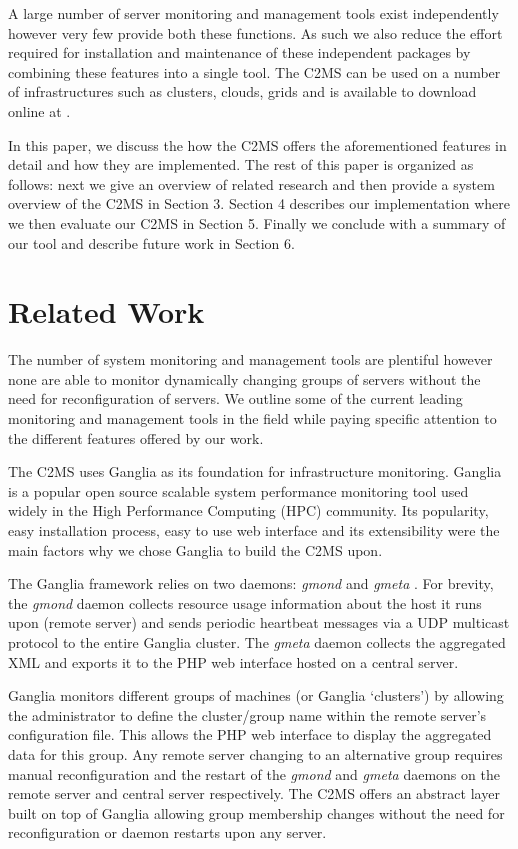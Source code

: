 \documentclass[10pt, conference, compsocconf]{IEEEtran}
\begin{document}
\noindent A large number of server monitoring and management tools exist independently however very few provide both these functions. As such we also reduce the effort required for installation and maintenance of these independent packages by combining these features into a single tool. The C2MS can be used on a number of infrastructures such as clusters, clouds, grids and is available to download online at \cite{c2ms_gary}.

In this paper, we discuss the how the C2MS offers the aforementioned features in detail and how they are implemented. The rest of this paper is organized as follows: next we give an overview of related research and then provide a system overview of the C2MS in Section 3. Section 4 describes our implementation where we then evaluate our C2MS in Section 5. Finally we conclude with a summary of our tool and describe future work in Section 6.

\section{Related Work}
The number of system monitoring and management tools are plentiful however none are able to monitor dynamically changing groups of servers without the need for reconfiguration of servers. We outline some of the current leading monitoring and management tools in the field while paying specific attention to the different features offered by our work. 

The C2MS uses Ganglia as its foundation for infrastructure monitoring. Ganglia is a popular open source scalable system performance monitoring tool \cite{ganglia,wide_area_ganglia,monitoring_taxonomy} used widely in the High Performance Computing (HPC) community. Its popularity, easy installation process, easy to use web interface and its extensibility were the main factors why we chose Ganglia to build the C2MS upon.

The Ganglia framework relies on two daemons: \textit{gmond} and \textit{gmeta} \cite{Massie2012}. For brevity, the \textit{gmond} daemon collects resource usage information about the host it runs upon (remote server) and sends periodic heartbeat messages via a UDP multicast protocol to the entire Ganglia cluster. The \textit{gmeta} daemon collects the aggregated XML and exports it to the PHP web interface hosted on a central server. 

Ganglia monitors different groups of machines (or Ganglia `clusters') by allowing the administrator to define the cluster/group name within the remote server's configuration file. This allows the PHP web interface to display the aggregated data for this group. Any remote server changing to an alternative group requires manual reconfiguration and the restart of the \textit{gmond} and \textit{gmeta} daemons on the remote server and central server respectively. The C2MS offers an abstract layer built on top of Ganglia allowing group membership changes without the need for reconfiguration or daemon restarts upon any server.
\end{document}
